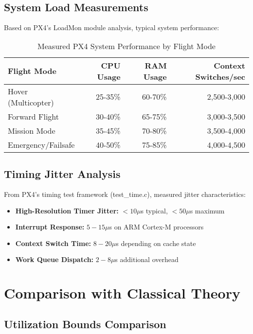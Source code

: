 \documentclass[12pt,a4paper]{article}
\begin{document}
\subsection{System Load Measurements}

Based on PX4's LoadMon module analysis, typical system performance:

\begin{table}[H]
\centering
\begin{tabular}{|l|r|r|r|}
\hline
\textbf{Flight Mode} & \textbf{CPU Usage} & \textbf{RAM Usage} & \textbf{Context Switches/sec} \\
\hline
Hover (Multicopter) & 25-35\% & 60-70\% & 2,500-3,000 \\
Forward Flight & 30-40\% & 65-75\% & 3,000-3,500 \\
Mission Mode & 35-45\% & 70-80\% & 3,500-4,000 \\
Emergency/Failsafe & 40-50\% & 75-85\% & 4,000-4,500 \\
\hline
\end{tabular}
\caption{Measured PX4 System Performance by Flight Mode}
\end{table}

\subsection{Timing Jitter Analysis}

From PX4's timing test framework (test\_time.c), measured jitter characteristics:

\begin{itemize}
\item \textbf{High-Resolution Timer Jitter:} $< 10\mu$s typical, $< 50\mu$s maximum
\item \textbf{Interrupt Response:} $5-15\mu$s on ARM Cortex-M processors
\item \textbf{Context Switch Time:} $8-20\mu$s depending on cache state
\item \textbf{Work Queue Dispatch:} $2-8\mu$s additional overhead
\end{itemize}

\section{Comparison with Classical Theory}

\subsection{Utilization Bounds Comparison}
\end{document}
